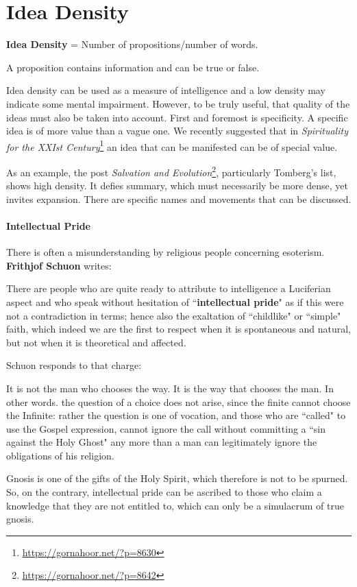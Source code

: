 \section{Idea Density}

\textbf{Idea Density} = Number of propositions/number of words.

A proposition contains information and can be true or false.

Idea density can be used as a measure of intelligence and a low density may indicate some mental impairment. However, to be truly useful, that quality of the ideas must also be taken into account. First and foremost is specificity. A specific idea is of more value than a vague one. We recently suggested that in \textit{Spirituality for the XXIst Century}\footnote{\url{https://gornahoor.net/?p=8630}} an idea that can be manifested can be of special value.

As an example, the post \textit{Salvation and Evolution}\footnote{\url{https://gornahoor.net/?p=8642}}, particularly Tomberg's list, shows high density. It defies summary, which must necessarily be more dense, yet invites expansion. There are specific names and movements that can be discussed. 

\paragraph{Intellectual Pride}
There is often a misunderstanding by religious people concerning esoterism. \textbf{Frithjof Schuon} writes:

\begin{quotex}
There are people who are quite ready to attribute to intelligence a Luciferian aspect and who speak without hesitation of ``\textbf{in\-tel\-lec\-tu\-al pride}" as if this were not a contradiction in terms; hence also the exaltation of ``childlike" or ``simple" faith, which indeed we are the first to respect when it is spontaneous and natural, but not when it is theoretical and affected. 

\end{quotex}
Schuon responds to that charge:

\begin{quotex}
It is not the man who chooses the way. It is the way that chooses the man. In other words. the question of a choice does not arise, since the finite cannot choose the Infinite: rather the question is one of vocation, and those who are ``called" to use the Gospel expression, cannot ignore the call without committing a ``sin against the Holy Ghost" any more than a man can legitimately ignore the obligations of his religion. 

\end{quotex}
Gnosis is one of the gifts of the Holy Spirit, which therefore is not to be spurned. So, on the contrary, intellectual pride can be ascribed to those who claim a knowledge that they are not entitled to, which can only be a simulacrum of true gnosis.

